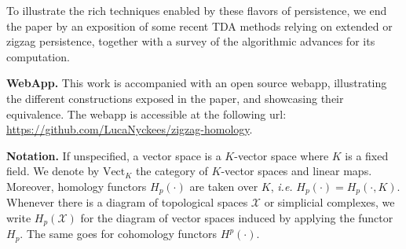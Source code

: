 \documentclass[11pt]{article}
\theoremstyle{remark}
\begin{document}
To illustrate the rich techniques enabled by these flavors of persistence, we end the paper by an exposition of some recent TDA methods relying on extended or zigzag persistence, together with a survey of the algorithmic advances for its computation.

\bigskip

\noindent \textbf{WebApp.} This work is accompanied with an open source webapp, illustrating the different constructions exposed in the paper, and showcasing their equivalence. The webapp is accessible at the following url: \url{https://github.com/LucaNyckees/zigzag-homology}.

\bigskip

\noindent \textbf{Notation.} If unspecified, a vector space is a $K$-vector space where $K$ is a fixed field. We denote by $\text{Vect}_K$ the category of $K$-vector spaces and linear maps. Moreover, homology functors $H_p(\cdot)$ are taken over $K$, \textit{i.e.} $H_p(\cdot)=H_p(\cdot,K)$. Whenever there is a diagram of topological spaces $\mathcal{X}$ or simplicial complexes, we write $H_p(\mathcal{X})$ for the diagram of vector spaces induced by applying the functor $H_p$. The same goes for cohomology functors $H^p(\cdot)$.
\end{document}

